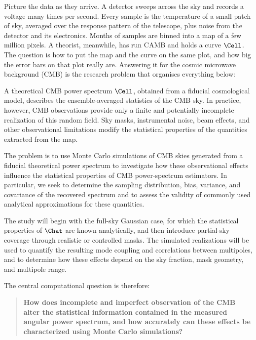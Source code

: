Picture the data as they arrive. A detector sweeps across the sky and records a voltage
many times per second. Every sample is the temperature of a small patch of sky, averaged
over the response pattern of the telescope, plus noise from the detector and its
electronics. Months of samples are binned into a map of a few million pixels. A theorist,
meanwhile, has run CAMB and holds a curve $\Cell$. The question is how to put the map and the
curve on the same plot, and how big the error bars on that plot really are. Answering it
for the cosmic microwave background (CMB) is the research problem that organises everything below:

\begin{framing}
A theoretical CMB power spectrum $\Cell$, obtained from a fiducial cosmological model,
describes the ensemble-averaged statistics of the CMB sky. In practice, however, CMB
observations provide only a finite and potentially incomplete realization of this random
field. Sky masks, instrumental noise, beam effects, and other observational limitations
modify the statistical properties of the quantities extracted from the map.

The problem is to use Monte Carlo simulations of CMB skies generated from a fiducial
theoretical power spectrum to investigate how these observational effects influence the
statistical properties of CMB power-spectrum estimators. In particular, we seek to
determine the sampling distribution, bias, variance, and covariance of the recovered
spectrum and to assess the validity of commonly used analytical approximations for these
quantities.

The study will begin with the full-sky Gaussian case, for which the statistical properties
of $\Chat$ are known analytically, and then introduce partial-sky coverage through
realistic or controlled masks. The simulated realizations will be used to quantify the
resulting mode coupling and correlations between multipoles, and to determine how these
effects depend on the sky fraction, mask geometry, and multipole range.

The central computational question is therefore:
\begin{quote}
\textbf{How does incomplete and imperfect observation of the CMB alter the statistical
information contained in the measured angular power spectrum, and how accurately can these
effects be characterized using Monte Carlo simulations?}
\end{quote}
\end{framing}


